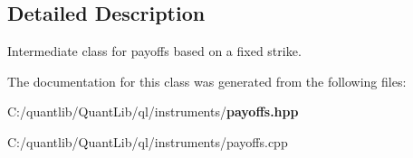 \subsection{Detailed Description}
Intermediate class for payoffs based on a fixed strike. 

The documentation for this class was generated from the following files\+:\begin{DoxyCompactItemize}
\item 
C\+:/quantlib/\+Quant\+Lib/ql/instruments/{\bf payoffs.\+hpp}\item 
C\+:/quantlib/\+Quant\+Lib/ql/instruments/payoffs.\+cpp\end{DoxyCompactItemize}
